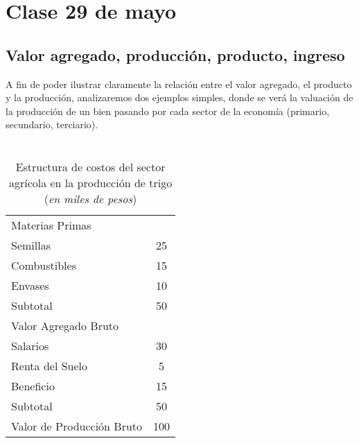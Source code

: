 \section{Clase 29 de mayo}

\subsection{Valor agregado, producción, producto, ingreso}

A fin de poder ilustrar claramente la relación entre el valor agregado,
el producto y la producción,
analizaremos dos ejemplos simples,
donde se verá la valuación de la producción de un bien
pasando por cada sector de la economía
(primario, secundario, terciario).

\vspace{.5cm}
\begin{table}[H]
    \centering
    \caption{\\Estructura de costos del sector agrícola en la producción de trigo\\
        (\textit{en miles de pesos})}
    \vspace{.5cm}
    \begin{tabular}{lc}
        \hline
        Materias Primas               &     \\
        \hspace{.3cm} Semillas        & 25  \\
        \hspace{.3cm} Combustibles    & 15  \\
        \hspace{.3cm} Envases         & 10  \\
        Subtotal                      & 50  \\
        \hline
        Valor Agregado Bruto          &     \\
        \hspace{.3cm} Salarios        & 30  \\
        \hspace{.3cm} Renta del Suelo & 5   \\
        \hspace{.3cm} Beneficio       & 15  \\
        Subtotal                      & 50  \\
        \hline
        Valor de Producción Bruto     & 100 \\
    \end{tabular}
\end{table}
\vspace{.5cm}

